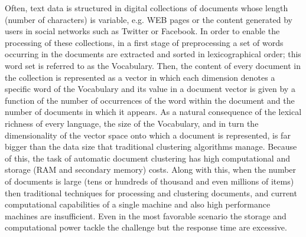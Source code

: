 \documentclass[10pt]{article}
\begin{document}
Often, text data is structured in digital collections of documents whose length (number of characters) is variable, e.g. WEB pages or the content generated by users in social networks such as Twitter or Facebook. In order to enable the processing of these collections, in a first stage of preprocessing a set of words occurring in the documents are extracted and sorted in lexicographical order; this word set is referred to as the Vocabulary. Then, the content of every document in the collection is represented as a vector in which each dimension denotes a specific word of the Vocabulary and its value in a document vector is given by a function of the number of occurrences of the word within the document and the number of documents in which it appears. As a natural consequence of the lexical richness of every language, the size of the Vocabulary, and in turn the dimensionality of the vector space onto which a document is represented,  is far bigger than the data size that traditional clustering algorithms manage. Because of this, the task of automatic document clustering has high computational and storage (RAM and secondary memory) costs. Along with this, when the number of documents is large (tens or hundreds of thousand and even millions of items) then traditional techniques for processing and clustering documents, and current computational capabilities of a single machine and also high performance machines are insufficient. Even in the most favorable scenario the storage and computational power tackle the challenge but the response time are excessive.
\end{document}
